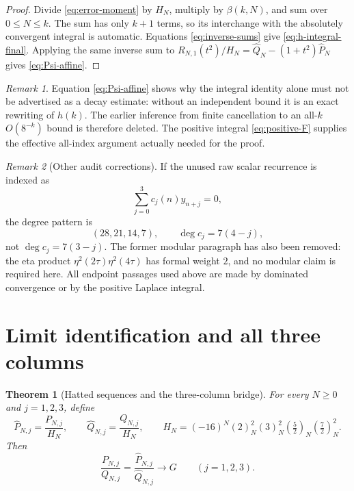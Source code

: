 \documentclass[11pt]{article}
\newtheorem{theorem}{Theorem}
\theoremstyle{remark}
\newtheorem{remark}{Remark}
\begin{document}
\begin{proof}
Divide \eqref{eq:error-moment} by $H_N$, multiply by
$\beta(k,N)$, and sum over $0\leq N\leq k$.  The sum has only
$k+1$ terms, so its interchange with the absolutely convergent
integral is automatic.  Equations \eqref{eq:inverse-sums} give
\eqref{eq:h-integral-final}.  Applying the same inverse sum to
$R_{N,1}(t^2)/H_N=\widehat Q_N-(1+t^2)\widehat P_N$ gives
\eqref{eq:Psi-affine}.
\end{proof}

\begin{remark}
Equation \eqref{eq:Psi-affine} shows why the integral identity alone
must not be advertised as a decay estimate: without an independent
bound it is an exact rewriting of $h(k)$.  The earlier inference from
finite cancellation to an all-$k$ $O(8^{-k})$ bound is therefore
deleted.  The positive integral \eqref{eq:positive-F} supplies the
effective all-index argument actually needed for the proof.
\end{remark}

\begin{remark}[Other audit corrections]
If the unused raw scalar recurrence is indexed as
\[
 \sum_{j=0}^3c_j(n)y_{n+j}=0,
\]
the degree pattern is
\[
 (28,21,14,7),\qquad \deg c_j=7(4-j),
\]
not $\deg c_j=7(3-j)$.
The former modular paragraph has also been removed: the eta product
$\eta^2(2\tau)\eta^2(4\tau)$ has formal weight $2$, and no modular
claim is required here.  All endpoint passages used above are made
by dominated convergence or by the positive Laplace integral.
\end{remark}

\section{Limit identification and all three columns}

\begin{theorem}[Hatted sequences and the three-column bridge]
\label{thm:all-columns}
For every $N\geq0$ and $j=1,2,3$, define
\begin{equation}\label{eq:hats-all}
 \widehat P_{N,j}=\frac{P_{N,j}}{H_N},\qquad
 \widehat Q_{N,j}=\frac{Q_{N,j}}{H_N},
 \qquad
 H_N=(-16)^N(2)_N^2(3)_N^2(\tfrac52)_N(\tfrac72)_N^2.
\end{equation}
Then
\[
 \frac{P_{N,j}}{Q_{N,j}}
 =\frac{\widehat P_{N,j}}{\widehat Q_{N,j}}\longrightarrow G
 \qquad(j=1,2,3).
\]
\end{theorem}
\end{document}
